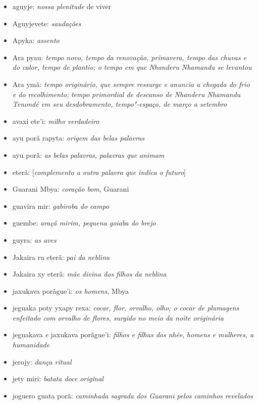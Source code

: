  

\begin{itemize}
\itemsep1pt\parskip0pt
\item
  aguyje: \emph{nossa plenitude} de viver
\item
  Aguyjevete: \emph{saudações}
\item
  Apyka: \emph{assento}
\item
  Ara pyau: \emph{tempo novo, tempo da renovação, primavera, tempo das
  chuvas e do calor, tempo de plantio; o} \emph{tempo em que Nhanderu
  Nhamandu se levantou}
\item
  Ara ymã: \emph{tempo originário, que sempre ressurge e anuncia a
  chegada do frio e do recolhimento;} \emph{tempo primordial de descanso
  de Nhanderu Nhamandu Tenondé em seu desdobramento, tempo"-espaço, de
  março a setembro} 
\item
  avaxi ete'i: \emph{milho verdadeiro}
\item
  ayu porã rapyta: \emph{origem das belas palavras}
\item
  ayu porã: \emph{as belas palavras,} \emph{palavras que animam}
\item
  eterã: [\emph{complemento a outra palavra que indica o futuro}]
\item
  Guarani Mbya: \emph{coração bom}, Guarani
\item
  guavira mir: \emph{gabiroba do campo}
\item
  guembe: \emph{araçá mirim, pequena goiaba do brejo}
\item
  guyra: \emph{as aves}
\item
  Jakaira ru eterã: \emph{pai da neblina}
\item
  Jakaira xy eterã: \emph{mãe divina dos filhos da neblina}
\item
  jaxukava porãgue'i: \emph{os homens}, Mbya
\item
  jeguaka poty yxapy rexa: \emph{cocar, flor, orvalho, olho; o cocar de
  plumagens enfeitado com orvalho de flores, surgido no meio da noite
  originária}
\item
  jeguakava \emph{e} jaxukava porãgue'i: \emph{filhos e filhas dos}
  \emph{nhẽe}, \emph{homens e mulheres, a humanidade}
\item
  jerojy: \emph{dança ritual}
\item
  jety miri: \emph{batata doce original}
\item
  joguero guata porã: \emph{caminhada} \emph{sagrada dos Guarani
  pelos} \emph{caminhos revelados} 

\end{itemize}

